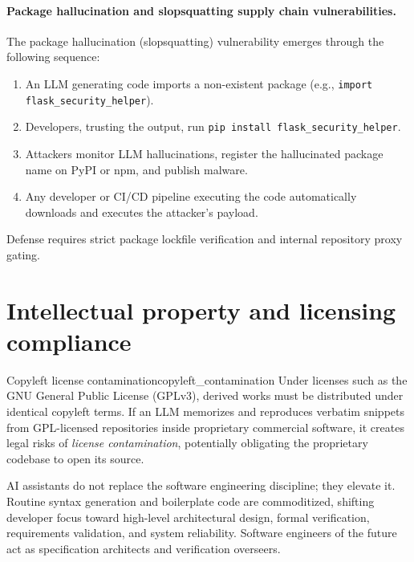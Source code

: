 \documentclass[../../main.tex]{subfiles}
\begin{document}
\paragraph{Package hallucination and slopsquatting supply chain vulnerabilities.}
The package hallucination (slopsquatting) vulnerability emerges through the following sequence:
\begin{enumerate}
    \item An LLM generating code imports a non-existent package (e.g., \texttt{import flask\_security\_helper}).
    \item Developers, trusting the output, run \texttt{pip install flask\_security\_helper}.
    \item Attackers monitor LLM hallucinations, register the hallucinated package name on PyPI or npm, and publish malware.
    \item Any developer or CI/CD pipeline executing the code automatically downloads and executes the attacker's payload.
\end{enumerate}
Defense requires strict package lockfile verification and internal repository proxy gating.


\section{Intellectual property and licensing compliance}
\begin{definition}{Copyleft license contamination}{copyleft_contamination}
Under licenses such as the GNU General Public License (GPLv3), derived works must be distributed under identical copyleft terms. If an LLM memorizes and reproduces verbatim snippets from GPL-licensed repositories inside proprietary commercial software, it creates legal risks of \emph{license contamination}, potentially obligating the proprietary codebase to open its source.
\end{definition}

\begin{deepdive}
AI assistants do not replace the software engineering discipline; they elevate it. Routine syntax generation and boilerplate code are commoditized, shifting developer focus toward high-level architectural design, formal verification, requirements validation, and system reliability. Software engineers of the future act as specification architects and verification overseers.
\end{deepdive}
\end{document}
